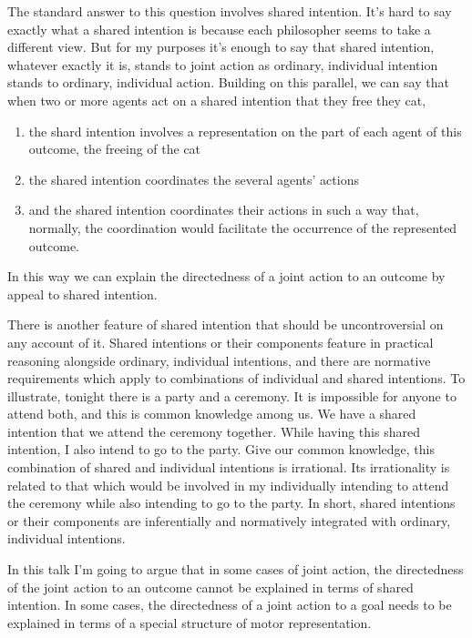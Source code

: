 \documentclass[12pt,\papersize]{extarticle}
\begin{document}
The standard answer to this question involves shared intention.
It's hard to say exactly what a shared intention is because each philosopher seems to take a different view.
But for my purposes it's enough to say that shared intention, whatever exactly it is, stands to joint action as ordinary, individual intention stands to ordinary, individual action.
Building on this parallel,
we can say that when two or more agents act on a shared intention that they free they cat,
\begin{enumerate}
\item the shard intention involves a representation on the part of each agent of this outcome, the freeing of the cat
\item the shared intention coordinates the several agents' actions
\item and the shared intention coordinates their actions in such a way that, normally, the coordination would facilitate the occurrence of the represented outcome. 
\end{enumerate}
In this way we can explain the directedness of a joint action to an outcome by appeal to shared intention.

There is another feature of shared intention that should be uncontroversial on any account of it.  
Shared intentions or their components feature in practical reasoning alongside ordinary, individual intentions,
 and there are normative requirements which apply to combinations of individual and shared intentions.
To illustrate, tonight there is a party and a ceremony.
It is impossible for anyone to attend both, and this is common knowledge among us.
We have a shared intention that we attend the ceremony together.
While having this shared intention, I also intend to go to the party. 
Give our common knowledge,
this combination of shared and individual intentions is irrational. 
Its irrationality is related to that which would be involved in my individually intending to attend the ceremony while also intending to go to the party.
In short, shared intentions or their components are inferentially and normatively integrated with ordinary, individual intentions.

In this talk I'm going to argue that in some cases of joint action,
the directedness of the joint action to an outcome cannot be explained in terms of shared intention.
In some cases, the directedness of a joint action to a goal needs to be explained in terms of a special structure of motor representation.
\end{document}
